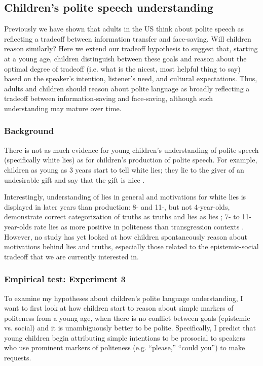 \subsection{Children's polite speech understanding}
\label{sec:child}

Previously we have shown that adults in the US think about polite speech as reflecting a tradeoff between information transfer and face-saving. Will children reason similarly? Here we extend our tradeoff hypothesis to suggest that, starting at a young age, children distinguish between these goals and reason about the optimal degree of tradeoff (i.e. what is the nicest, most helpful thing to say) based on the speaker's intention, listener's need, and cultural expectations. Thus, adults and children should reason about polite language as broadly reflecting a tradeoff between information-saving and face-saving, although such understanding may mature over time. 

\subsubsection{Background}

There is not as much evidence for young children's understanding of polite speech (specifically white lies) as for children's production of polite speech. For example, children as young as 3 years start to tell white lies; they lie to the giver of an undesirable gift and say that the gift is nice \citep{talwar2007}. 

Interestingly, understanding of lies in general and motivations for white lies is displayed in later years than production: 8- and 11-, but not 4-year-olds, demonstrate correct categorization of truths as truths and lies as lies \citep{bussey1999}; 7- to 11-year-olds rate lies as more positive in politeness than transgression contexts \citep{heyman2009}. However, no study has yet looked at how children spontaneously reason about motivations behind lies and truths, especially those related to the epistemic-social tradeoff that we are currently interested in. 

\subsubsection{Empirical test: Experiment 3}

To examine my hypotheses about children's polite language understanding, I want to first look at how children start to reason about simple markers of politeness from a young age, when there is no conflict between goals (epistemic vs. social) and it is unambiguously better to be polite. Specifically, I predict that young children begin attributing simple intentions to be prosocial to speakers who use prominent markers of politeness (e.g. ``please,'' ``could you'') to make requests. 

